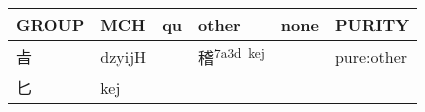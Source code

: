 \documentclass[14pt,a4paper]{scrartcl}
\begin{document}
\begin{longtable}[c]{@{}llllll@{}}
\toprule
\begin{minipage}[b]{0.14\columnwidth}\raggedright\strut
GROUP
\strut\end{minipage} &
\begin{minipage}[b]{0.14\columnwidth}\raggedright\strut
MCH
\strut\end{minipage} &
\begin{minipage}[b]{0.14\columnwidth}\raggedright\strut
qu
\strut\end{minipage} &
\begin{minipage}[b]{0.14\columnwidth}\raggedright\strut
other
\strut\end{minipage} &
\begin{minipage}[b]{0.14\columnwidth}\raggedright\strut
none
\strut\end{minipage} &
\begin{minipage}[b]{0.14\columnwidth}\raggedright\strut
PURITY
\strut\end{minipage}\tabularnewline
\midrule
\endhead
\begin{minipage}[t]{0.14\columnwidth}\raggedright\strut
㫖
\strut\end{minipage} &
\begin{minipage}[t]{0.14\columnwidth}\raggedright\strut
dzyijH
\strut\end{minipage} &
\begin{minipage}[t]{0.14\columnwidth}\raggedright\strut
\strut\end{minipage} &
\begin{minipage}[t]{0.14\columnwidth}\raggedright\strut
稽\textsuperscript{7a3d~kej}
\strut\end{minipage} &
\begin{minipage}[t]{0.14\columnwidth}\raggedright\strut
\strut\end{minipage} &
\begin{minipage}[t]{0.14\columnwidth}\raggedright\strut
pure:other
\strut\end{minipage}\tabularnewline
\begin{minipage}[t]{0.14\columnwidth}\raggedright\strut
匕
\strut\end{minipage} &
\begin{minipage}[t]{0.14\columnwidth}\raggedright\strut
kej
\strut\end{minipage} &
\begin{minipage}[t]{0.14\columnwidth}\raggedright\strut
\strut\end{minipage} &

\end{longtable}
\end{document}
